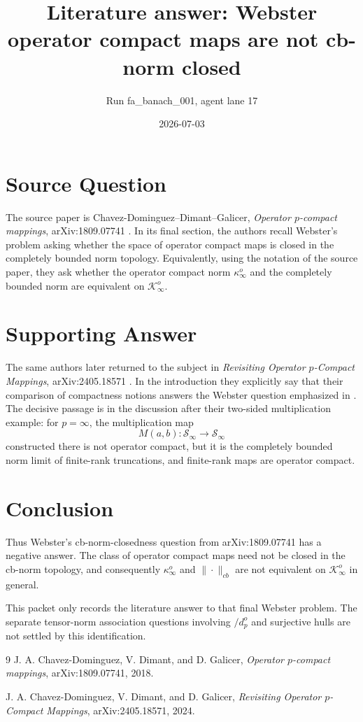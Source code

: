 \documentclass[11pt]{article}
\title{Literature answer: Webster operator compact maps are not cb-norm closed}
\author{Run fa\_banach\_001, agent lane 17}
\date{2026-07-03}
\begin{document}
\maketitle

\sloppy

\section*{Source Question}

The source paper is Chavez-Dominguez--Dimant--Galicer,
\emph{Operator \(p\)-compact mappings}, arXiv:1809.07741 \cite{CDG2018}.
In its final section, the authors recall Webster's problem asking whether the
space of operator compact maps is closed in the completely bounded norm
topology. Equivalently, using the notation of the source paper, they ask
whether the operator compact norm \(\kappa_\infty^o\) and the completely
bounded norm are equivalent on \(\mathcal K_\infty^o\).

\section*{Supporting Answer}

The same authors later returned to the subject in
\emph{Revisiting Operator \(p\)-Compact Mappings}, arXiv:2405.18571
\cite{CDG2024}. In the introduction they explicitly say that their comparison
of compactness notions answers the Webster question emphasized in
\cite{CDG2018}. The decisive passage is in the discussion after their
two-sided multiplication example: for \(p=\infty\), the multiplication map
\[
  M(a,b):\mathcal S_\infty\longrightarrow \mathcal S_\infty
\]
constructed there is not operator compact, but it is the completely bounded
norm limit of finite-rank truncations, and finite-rank maps are operator
compact.

\section*{Conclusion}

Thus Webster's cb-norm-closedness question from arXiv:1809.07741 has a
negative answer. The class of operator compact maps need not be closed in the
cb-norm topology, and consequently \(\kappa_\infty^o\) and
\(\|\cdot\|_{cb}\) are not equivalent on \(\mathcal K_\infty^o\) in general.

This packet only records the literature answer to that final Webster problem.
The separate tensor-norm association questions involving \(/d_p^o\) and
surjective hulls are not settled by this identification.

\begin{thebibliography}{9}
J. A. Chavez-Dominguez, V. Dimant, and D. Galicer,
\emph{Operator \(p\)-compact mappings}, arXiv:1809.07741, 2018.

J. A. Chavez-Dominguez, V. Dimant, and D. Galicer,
\emph{Revisiting Operator \(p\)-Compact Mappings}, arXiv:2405.18571, 2024.
\end{thebibliography}
\end{document}

